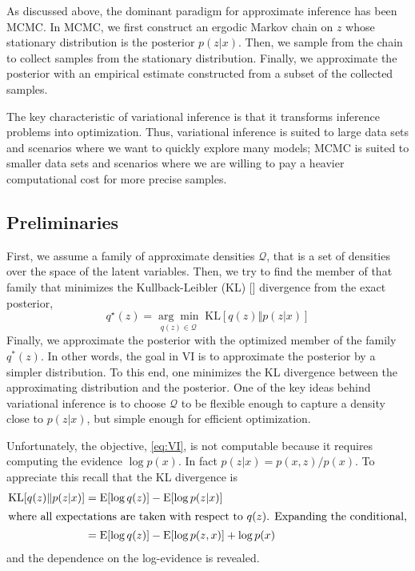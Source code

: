 As discussed above, the dominant paradigm for approximate inference has been MCMC. In MCMC, we first construct an ergodic Markov chain on $z$
whose stationary distribution is the posterior $p(z|x)$. Then, we sample from the chain to collect samples from the stationary distribution. Finally, we approximate the posterior with an empirical estimate constructed from a subset of the collected samples. 

The key characteristic of variational inference is that it transforms inference problems into optimization. Thus, variational inference is suited to large data sets and scenarios where we want to quickly explore many models; MCMC is suited to smaller data sets and scenarios where we are willing to pay a heavier computational cost for more precise samples. 



\subsection{Preliminaries}
First, we assume a family of approximate densities $\mathcal{Q}$, that is a set of densities over the space of the latent variables. Then, we try to find the member of that family that minimizes the Kullback-Leibler
(KL) [\cite{KL1951}] divergence from the exact posterior,
\begin{equation}
    q^\star(z) = \underset{q(z)\in\mathcal{Q}}{\arg \min} \; \mathrm{KL}[q(z)\Vert p(z|x)] 
    \label{eq:VI}
\end{equation}
Finally, we approximate the posterior with the optimized member of the family $q^*(z)$. In other words, the goal in VI is to approximate the posterior by a simpler distribution. To this end, one minimizes the KL  divergence between the approximating distribution and the posterior. One of the key ideas behind variational inference is to choose $\mathcal{Q}$ to be flexible enough to capture a density close to $p(z | x)$, but simple enough for efficient optimization.

Unfortunately, the objective, \eqref{eq:VI}, is not computable because it requires computing the evidence $\log p(x)$. In fact $p(z|x) = p(x,z)/p(x)$. To appreciate this recall that the KL divergence is
\begin{align}
    \mathrm{KL}[q(z)\Vert p(z|x)] &= \mathrm{E}[\log q(z)] - \mathrm{E}[\log p(z|x)] \nonumber\\
    \intertext{where all expectations are taken with respect to $q(z)$. Expanding the conditional,}
     &= \mathrm{E}[\log q(z)] - \mathrm{E}[\log p(z, x)] + \log p(x) \label{eq:KL}
\end{align}
and the dependence on the log-evidence is revealed.

